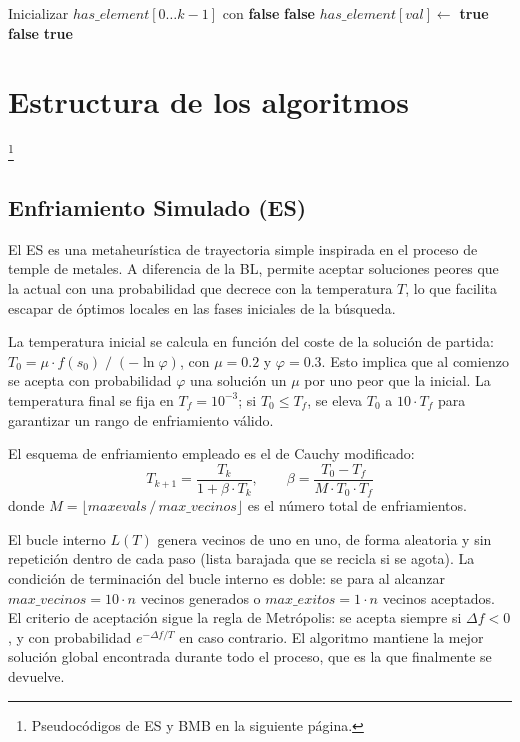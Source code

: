 \documentclass[a4paper,12pt]{article}%
\begin{document}
\begin{algorithm}[H]
	\begin{algorithmic}
		\State Inicializar $has\_element[0 \dots k-1]$ con \textbf{false}
		\State \Return \textbf{false}
		\EndIf
		\State $has\_element[val] \gets$ \textbf{true}
		\EndFor
		\State \Return \textbf{false}
		\EndIf
		\EndFor
		\State \Return \textbf{true}
		\EndFunction
	\end{algorithmic}
\end{algorithm}

\newpage
\section{Estructura de los algoritmos}
\footnote{Pseudocódigos de ES y BMB en la siguiente página.}
\subsection{Enfriamiento Simulado (ES)}

\noindent El ES es una metaheurística de trayectoria simple inspirada en el proceso de temple de metales. A diferencia de la BL, permite aceptar soluciones peores que la actual con una probabilidad que decrece con la temperatura $T$, lo que facilita escapar de óptimos locales en las fases iniciales de la búsqueda.

La temperatura inicial se calcula en función del coste de la solución de partida: $T_0 = \mu \cdot f(s_0)\;/\;(-\ln\varphi)$, con $\mu = 0.2$ y $\varphi = 0.3$. Esto implica que al comienzo se acepta con probabilidad $\varphi$ una solución un $\mu$ por uno peor que la inicial. La temperatura final se fija en $T_f = 10^{-3}$; si $T_0 \leq T_f$, se eleva $T_0$ a $10 \cdot T_f$ para garantizar un rango de enfriamiento válido.

El esquema de enfriamiento empleado es el de Cauchy modificado:
\[
T_{k+1} = \frac{T_k}{1 + \beta \cdot T_k}, \qquad
\beta = \frac{T_0 - T_f}{M \cdot T_0 \cdot T_f}
\]
donde $M = \lfloor \textit{maxevals}\,/\,\textit{max\_vecinos} \rfloor$ es el número total de enfriamientos.

El bucle interno $L(T)$ genera vecinos de uno en uno, de forma aleatoria y sin repetición dentro de cada paso (lista barajada que se recicla si se agota). La condición de terminación del bucle interno es doble: se para al alcanzar $\textit{max\_vecinos} = 10 \cdot n$ vecinos generados o $\textit{max\_exitos} = 1 \cdot n$ vecinos aceptados. El criterio de aceptación sigue la regla de Metrópolis: se acepta siempre si $\Delta f < 0$, y con probabilidad $e^{-\Delta f / T}$ en caso contrario. El algoritmo mantiene la mejor solución global encontrada durante todo el proceso, que es la que finalmente se devuelve. 
\end{document}
